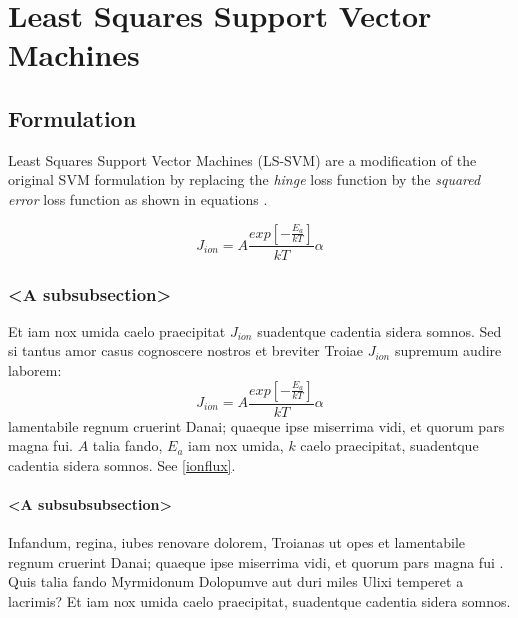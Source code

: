 \documentclass[
    ,final            %
  ]
  {aipproc}
\begin{document}
\section{Least Squares Support Vector Machines}

\subsection{Formulation}
 Least Squares Support Vector Machines (LS-SVM) \cite{Suykens1999} are a modification of the original SVM formulation by replacing the \textit{hinge} loss function by the \textit{squared error} loss function as shown in equations .
 
\begin{equation}
J_{ion}=A\frac{exp\left[-\frac{E_a}{kT}\right]}{kT}\alpha \label{ionflux}
\end{equation} 

\subsubsection{<A subsubsection>}

Et iam nox umida caelo praecipitat $J_{ion}$ suadentque cadentia
sidera somnos. Sed si tantus amor casus cognoscere nostros et breviter
Troiae $J_{ion}$ supremum audire laborem:
\begin{equation}
J_{ion}=A\frac{exp\left[-\frac{E_a}{kT}\right]}{kT}\alpha \label{ionflux}
\end{equation}
lamentabile regnum cruerint Danai; quaeque ipse miserrima vidi, et
quorum pars magna fui. $A$ talia fando, $E_a$ iam nox umida, $k$ caelo
praecipitat, suadentque cadentia sidera somnos. See \eqref{ionflux}.

\paragraph{<A subsubsubsection>}

Infandum, regina, iubes renovare dolorem, Troianas ut opes et
lamentabile regnum cruerint Danai; quaeque ipse miserrima vidi, et
quorum pars magna fui \cite{Suykens2002}. Quis talia fando
Myrmidonum Dolopumve aut duri miles Ulixi temperet
\cite{Suykens2002} a lacrimis? Et iam
nox umida caelo praecipitat, suadentque \cite{Suykens2002} cadentia
sidera somnos.

\end{document}
